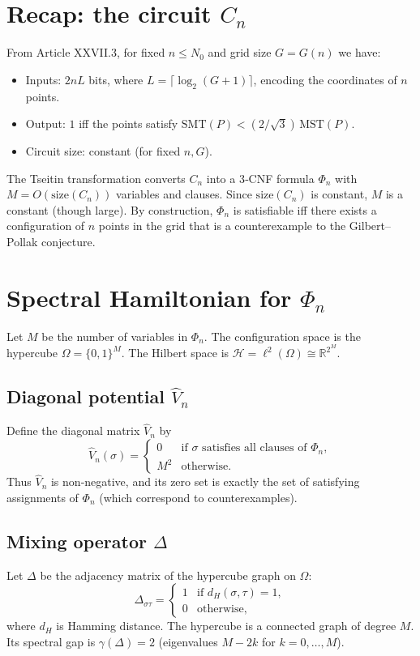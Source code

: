 \documentclass[11pt,a4paper]{article}
\begin{document}
\section{Recap: the circuit \(C_n\)}
From Article XXVII.3, for fixed \(n \le N_0\) and grid size \(G = G(n)\) we have:
\begin{itemize}
\item Inputs: \(2nL\) bits, where \(L = \lceil \log_2(G+1)\rceil\), encoding the coordinates of \(n\) points.
\item Output: \(1\) iff the points satisfy \(\text{SMT}(P) < (2/\sqrt{3})\,\text{MST}(P)\).
\item Circuit size: constant (for fixed \(n,G\)).
\end{itemize}
The Tseitin transformation converts \(C_n\) into a 3‑CNF formula \(\Phi_n\) with \(M = O(\text{size}(C_n))\) variables and clauses. Since \(\text{size}(C_n)\) is constant, \(M\) is a constant (though large). By construction, \(\Phi_n\) is satisfiable iff there exists a configuration of \(n\) points in the grid that is a counterexample to the Gilbert–Pollak conjecture.

\section{Spectral Hamiltonian for \(\Phi_n\)}
Let \(M\) be the number of variables in \(\Phi_n\). The configuration space is the hypercube \(\Omega = \{0,1\}^M\). The Hilbert space is \(\mathcal{H} = \ell^2(\Omega) \cong \mathbb{R}^{2^M}\).

\subsection{Diagonal potential \(\hat{V}_n\)}
Define the diagonal matrix \(\hat{V}_n\) by
\[
\hat{V}_n(\sigma) = \begin{cases}
0 & \text{if }\sigma\text{ satisfies all clauses of } \Phi_n,\\
M^2 & \text{otherwise}.
\end{cases}
\]
Thus \(\hat{V}_n\) is non‑negative, and its zero set is exactly the set of satisfying assignments of \(\Phi_n\) (which correspond to counterexamples).

\subsection{Mixing operator \(\Delta\)}
Let \(\Delta\) be the adjacency matrix of the hypercube graph on \(\Omega\):
\[
\Delta_{\sigma\tau} = \begin{cases}
1 & \text{if } d_H(\sigma,\tau)=1,\\
0 & \text{otherwise},
\end{cases}
\]
where \(d_H\) is Hamming distance. The hypercube is a connected graph of degree \(M\). Its spectral gap is \(\gamma(\Delta)=2\) (eigenvalues \(M-2k\) for \(k=0,\dots,M\)).
\end{document}
